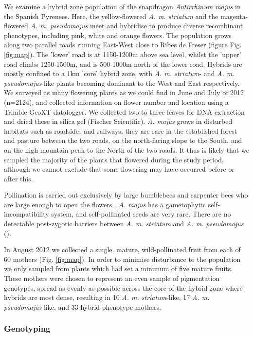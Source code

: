 \documentclass[10pt, a4paper, twocolumn]{article} %
\begin{document}
We examine a hybrid zone population of the snapdragon \textit{Antirrhinum majus} in the Spanish Pyrenees. Here, the yellow-flowered \textit{A. m. striatum} and the magenta-flowered \textit{A. m. pseudomajus} meet and hybridise to produce diverse recombinant phenotypes, including pink, white and orange flowers.
The population grows along two parallel roads running East-West close to Rib\"{e}s de Freser (figure Fig. \ref{fig:map}). The ’lower’ road is at 1150-1200m above sea level, whilst the ’upper’ road climbs 1250-1500m, and is 500-1000m north of the lower road. Hybrids are mostly confined to a 1km ’core’ hybrid zone, with \textit{A. m. striatum}- and \textit{A. m. pseudomajus}-like plants becoming dominant to the West and East respectively. We surveyed as many flowering plants as we could find in June and July of 2012 (n=2124), and collected information on flower number and location using a Trimble GeoXT datalogger. We collected two to three leaves for DNA extraction and dried these in silica gel (Fischer Scientific). \textit{A. majus} grows in disturbed habitats such as roadsides and railways; they are rare in the established forest and pasture between the two roads, on the north-facing slope to the South, and on the high mountain peak to the North of the two roads. It thus is likely that we sampled the majority of the plants that flowered during the study period, although we cannot exclude that some flowering may have occurred before or after this. 

Pollination is carried out exclusively by large bumblebees and carpenter bees who are large enough to open the flowers \cite{vargas2010occluded, andalo2019prevalence}. \textit{A. majus} has a gametophytic self-incompatibility system, and self-pollinated seeds are very rare. There are no detectable post-zygotic barriers between \textit{A. m. striatum} and \textit{A. m. pseudomajus} (\cite{andalo2010post}).

In August 2012 we collected a single, mature, wild-pollinated fruit from each of 60 mothers (Fig. \ref{fig:map}). In order to minimise disturbance to the population we only sampled from plants which had set a minimum of five mature fruits. These mothers were chosen to represent an even sample of pigmentation genotypes, spread as evenly as possible across the core of the hybrid zone where hybrids are most dense, resulting in 10 \textit{A. m. striatum}-like, 17 \textit{A. m. pseudomajus}-like, and 33 hybrid-phenotype mothers.

\subsubsection{Genotyping}
\end{document}
